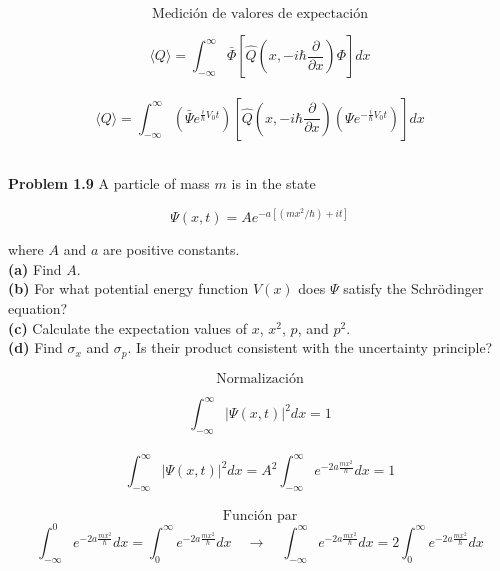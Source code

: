 \documentclass[10pt,a4papper]{article}
\begin{document}
\[\text{Medición de valores de expectación}\]

\[\langle Q\rangle=\int_{-\infty}^\infty\bar\Phi\left[\hat Q\left(x,-i\hbar\frac{\partial}{\partial x}\right)\Phi\right]dx\]\\

\[\langle Q\rangle=\int_{-\infty}^\infty
\left(\bar\Psi e^{\frac{i}{\hbar}V_0t}\right)
\left[\hat Q\left(x,-i\hbar\frac{\partial}{\partial x}\right)\left(\Psi e^{-\frac{i}{\hbar}V_0t}\right)\right]dx\]\\

\begin{center}
\end{center}

\newpage
\textbf{Problem 1.9} A particle of mass $m$ is in the state

\[\Psi(x,t)=Ae^{-a[(mx^2/\hbar)+it]}\]

where $A$ and $a$ are positive constants.\\

\textbf{(a)} Find $A$.\\
\textbf{(b)} For what potential energy function $V(x)$ does $\Psi$ satisfy the Schrödinger
equation?\\

\textbf{(c)} Calculate the expectation values of $x$, $x^2$, $p$, and $p^2$.\\
\textbf{(d)} Find $\sigma_x$ and $\sigma_p$. Is their product consistent with the uncertainty principle?

\newpage
\[\text{Normalización}\]

\[\int_{-\infty}^\infty|\Psi(x,t)|^2dx=1\]\\

\[\int_{-\infty}^\infty|\Psi(x,t)|^2dx=A^2\int_{-\infty}^\infty e^{-2a\frac{mx^2}{\hbar}}dx=1\]\\

\[\text{Función par}\]
\[\int_{-\infty}^0 e^{-2a\frac{mx^2}{\hbar}}dx=\int_0^\infty e^{-2a\frac{mx^2}{\hbar}}dx\quad\to\quad
\int_{-\infty}^\infty e^{-2a\frac{mx^2}{\hbar}}dx=2\int_0^\infty e^{-2a\frac{mx^2}{\hbar}}dx\]
\end{document}
